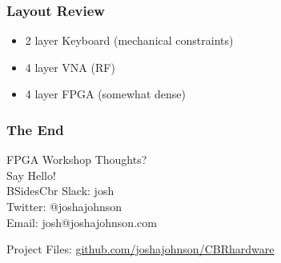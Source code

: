 \documentclass[t]{beamer}
\begin{document}
\begin{frame}
	\frametitle{Layout Review}
	\begin{itemize}
		\item 2 layer Keyboard (mechanical constraints)
		\item 4 layer VNA (RF)
		\item 4 layer FPGA (somewhat dense)
	\end{itemize}
\end{frame}

\begin{frame}
\frametitle{The End}
FPGA Workshop Thoughts?\\
\vspace{5mm}
Say Hello! \\
BSidesCbr Slack: josh\\
Twitter: @\textunderscore joshajohnson\\
Email: josh@joshajohnson.com\\
\vspace{4mm}

Project Files: \url{github.com/joshajohnson/CBRhardware}\\
\end{frame}
\end{document}
